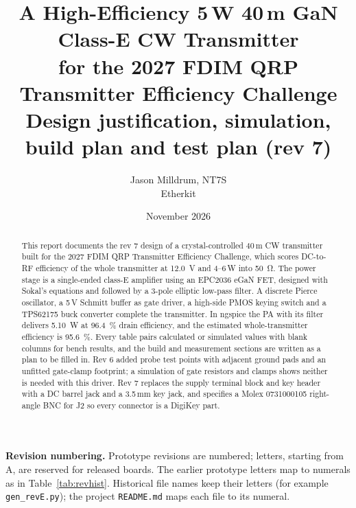 \documentclass[11pt,letterpaper]{article}
\title{A High-Efficiency 5\,W 40\,m GaN Class-E CW Transmitter\\for the 2027 FDIM QRP Transmitter Efficiency Challenge\\[0.4em]\large Design justification, simulation, build plan and test plan (rev 7)}
\author{Jason Milldrum, NT7S\\Etherkit}
\date{November 2026}
\begin{document}
\maketitle
\thispagestyle{empty}

\begin{abstract}
\noindent This report documents the rev 7 design of a crystal-controlled 40\,m CW transmitter built for the 2027 FDIM QRP Transmitter Efficiency Challenge, which scores DC-to-RF efficiency of the whole transmitter at \SI{12.0}{\volt} and 4--6\,W into \SI{50}{\ohm}. The power stage is a single-ended class-E amplifier using an EPC2036 eGaN FET, designed with Sokal's equations and followed by a 3-pole elliptic low-pass filter. A discrete Pierce oscillator, a 5\,V Schmitt buffer as gate driver, a high-side PMOS keying switch and a TPS62175 buck converter complete the transmitter. In ngspice the PA with its filter delivers \SI{5.10}{\watt} at \SI{96.4}{\percent} drain efficiency, and the estimated whole-transmitter efficiency is \SI{95.6}{\percent}. Every table pairs calculated or simulated values with blank columns for bench results, and the build and measurement sections are written as a plan to be filled in. Rev 6 added probe test points with adjacent ground pads and an unfitted gate-clamp footprint; a simulation of gate resistors and clamps shows neither is needed with this driver. Rev 7 replaces the supply terminal block and key header with a DC barrel jack and a 3.5\,mm key jack, and specifies a Molex 0731000105 right-angle BNC for J2 so every connector is a DigiKey part.
\end{abstract}

\medskip
\noindent\textbf{Revision numbering.} Prototype revisions are numbered; letters, starting from A, are reserved for released boards. The earlier prototype letters map to numerals as in Table~\ref{tab:revhist}. Historical file names keep their letters (for example \texttt{gen\_revE.py}); the project \texttt{README.md} maps each file to its numeral.
\end{document}
